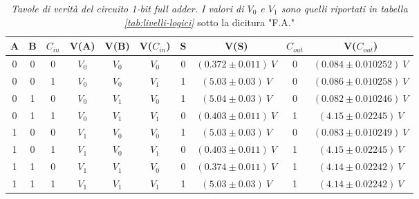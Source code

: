 \begin{table}[H]
  \centering
  \begin{tabular}[t]{c  c  c | c  c  c | c  c | c  c}
    \hline
    A & B & $C_{in}$ & V(A) & V(B) & V($C_{in}$) & S & V(S) & $C_{out}$ & V($C_{out}$) \\
    \hline
    0 & 0 & 0 & $V_{0}$ & $V_{0}$ & $V_{0}$ & 0 & $(0.372 \pm 0.011) \: V$   & 0 & $(0.084 \pm 0.010252 ) \: V$\\
    0 & 0 & 1 & $V_{0}$ & $V_{0}$ & $V_{1}$ & 1 & $(5.03 \pm 0.03) \: V$   & 0 & $(0.086 \pm 0.010258) \: V$\\
    0 & 1 & 0 & $V_{0}$ & $V_{1}$ & $V_{0}$ & 1 & $(5.04 \pm 0.03) \: V$   & 0 & $(0.082 \pm 0.010246) \: V$\\
    0 & 1 & 1 & $V_{0}$ & $V_{1}$ & $V_{1}$ & 0 & $(0.403 \pm 0.011) \: V$ & 1 & $(4.15 \pm 0.02245) \: V$\\
    1 & 0 & 0 & $V_{1}$ & $V_{0}$ & $V_{0}$ & 1 & $(5.03 \pm 0.03) \: V$   & 0 & $(0.083 \pm 0.010249) \: V$\\
    1 & 0 & 1 & $V_{1}$ & $V_{0}$ & $V_{1}$ & 0 & $(0.403 \pm 0.011) \: V$ & 1 & $(4.15 \pm 0.02245) \: V$\\
    1 & 1 & 0 & $V_{1}$ & $V_{1}$ & $V_{0}$ & 0 & $(0.374 \pm 0.011) \: V$ & 1 & $(4.14 \pm 0.02242) \: V$\\
    1 & 1 & 1 & $V_{1}$ & $V_{1}$ & $V_{1}$ & 1 & $(5.03 \pm 0.03) \: V$   & 1 & $(4.14 \pm 0.02242) \: V$\\
    \hline
  \end{tabular}
  \caption{\emph{Tavole di verità del circuito \emph{1-bit full adder}. I valori di $V_{0}$ e $V_{1}$ sono quelli riportati in tabella \ref{tab:livelli-logici}} sotto la dicitura "F.A."}
  \label{tab:fulladder}
\end{table}
